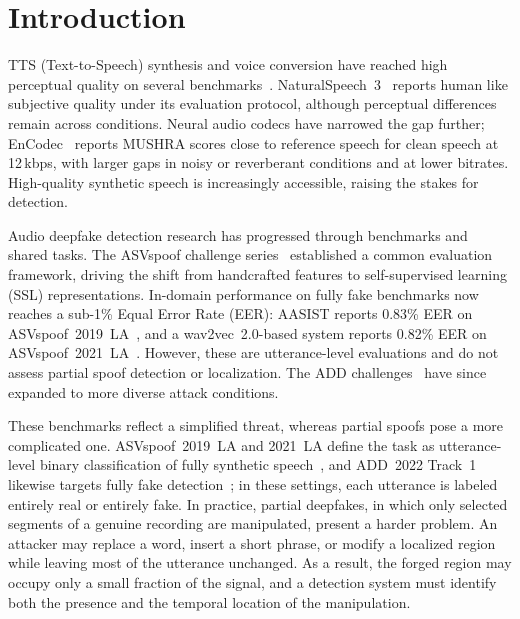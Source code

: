 \documentclass[journal]{IEEEtran}
\begin{document}
\section{Introduction}
\label{sec:intro}

TTS (Text-to-Speech) synthesis and voice conversion have reached high perceptual quality on several benchmarks~\cite{tan2021ttssurvey,pmlr-v235-ju24b}. NaturalSpeech~3~\cite{pmlr-v235-ju24b} reports human like subjective quality under its evaluation protocol, although perceptual differences remain across conditions. Neural audio codecs have narrowed the gap further; EnCodec~\cite{defossez2023encodec} reports MUSHRA scores close to reference speech for clean speech at 12\,kbps, with larger gaps in noisy or reverberant conditions and at lower bitrates. High-quality synthetic speech is increasingly accessible, raising the stakes for detection.

Audio deepfake detection research has progressed through benchmarks and shared tasks. The ASVspoof challenge series~\cite{wang2020asvspoof2019,yamagishi2021asvspoof2021,wang2024asvspoof5} established a common evaluation framework, driving the shift from handcrafted features to self-supervised learning (SSL) representations. In-domain performance on fully fake benchmarks now reaches a sub-1\% Equal Error Rate (EER): AASIST reports 0.83\%  EER on ASVspoof~2019~LA~\cite{jung2022aasist}, and a wav2vec~2.0-based system reports 0.82\% EER on ASVspoof~2021~LA~\cite{tak2022ssl}. However, these are utterance-level evaluations and do not assess partial spoof detection or localization. The ADD challenges~\cite{yi2022add,yi2023add} have since expanded to more diverse attack conditions.

These benchmarks reflect a simplified threat, whereas partial spoofs pose a more complicated one. ASVspoof~2019~LA and 2021~LA define the task as utterance-level binary classification of fully synthetic speech~\cite{wang2020asvspoof2019,yamagishi2021asvspoof2021}, and ADD~2022 Track~1 likewise targets fully fake detection~\cite{yi2022add}; in these settings, each utterance is labeled entirely real or entirely fake. In practice, partial deepfakes, in which only selected segments of a genuine recording are manipulated, present a harder problem. An attacker may replace a word, insert a short phrase, or modify a localized region while leaving most of the utterance unchanged. As a result, the forged region may occupy only a small fraction of the signal, and a detection system must identify both the presence and the temporal location of the manipulation.
\end{document}
